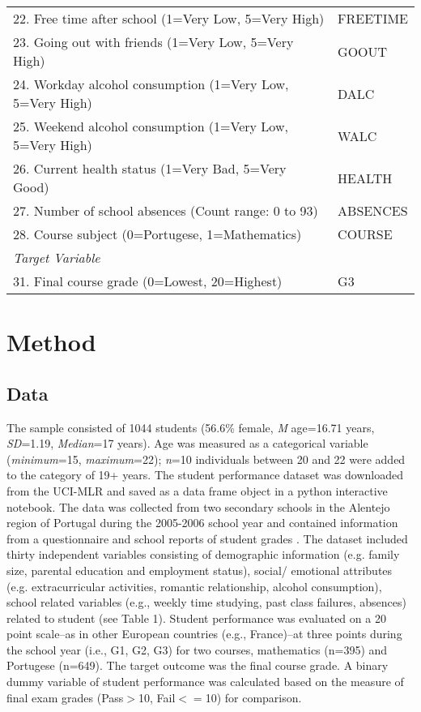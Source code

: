 \documentclass[sigconf]{acmart}
\begin{document}
\begin{table*}[ht]
\begin{tabular}{ll}
    22. Free time after school (1=Very Low, 5=Very High) & FREETIME  \\
    23. Going out with friends (1=Very Low, 5=Very High) & GOOUT  \\
    24. Workday alcohol consumption (1=Very Low, 5=Very High) & DALC  \\
    25. Weekend alcohol consumption (1=Very Low, 5=Very High) & WALC  \\
    26. Current health status (1=Very Bad, 5=Very Good) & HEALTH  \\ 
    27. Number of school absences (Count range: 0 to 93) & ABSENCES  \\
    28. Course subject (0=Portugese, 1=Mathematics) & COURSE  \\

    \midrule
    \textit{Target Variable} &  \\
    \midrule
    31. Final course grade (0=Lowest, 20=Highest) & G3 \\
    \bottomrule
  \end{tabular}
\end{table*}




\section{Method}

\subsection{Data}

The sample consisted of 1044 students (56.6\% female, \textit{M} age=16.71 
years, \textit{SD}=1.19, \textit{Median}=17 years). Age was measured as 
a categorical variable (\textit{minimum}=15, \textit{maximum}=22); 
\textit{n}=10 individuals between 20 and 22 were added to the category of 
19+ years. The student performance dataset was downloaded from the UCI-MLR 
and saved as a data frame object in a python interactive notebook. The data 
was collected from two secondary schools in the Alentejo region of Portugal 
during the 2005-2006 school year and contained information from a 
questionnaire and school reports of student grades \cite{cortez09}. 
The dataset included thirty independent variables consisting of demographic 
information (e.g. family size, parental education and employment status), 
social/ emotional attributes (e.g. extracurricular activities, romantic
relationship, alcohol consumption), school related variables (e.g., weekly 
time studying, past class failures, absences) related to student
(see Table 1). Student performance was evaluated on a 20 point scale--as in 
other European countries (e.g., France)--at three points during the school 
year (i.e., G1, G2, G3) for two courses, mathematics (n=395) and Portugese 
(n=649). The target outcome was the final course grade. A binary dummy
variable of student performance was calculated based on the measure of 
final exam grades (Pass$>$10, Fail$<=$10) for comparison.
\end{document}
